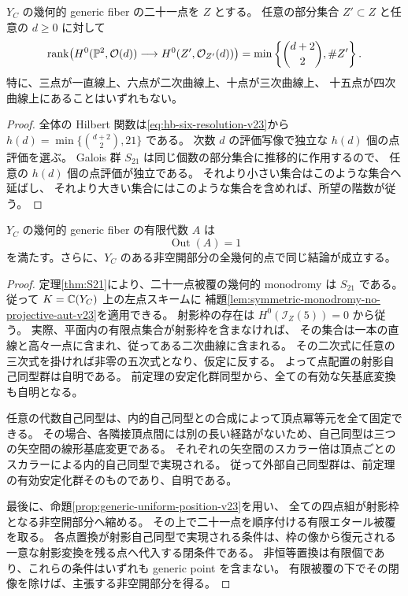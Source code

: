 \begin{proposition}
\label{prop:generic-uniform-position-v23}
$Y_C$ の幾何的 generic fiber の二十一点を $Z$ とする。
任意の部分集合 $Z'\subset Z$ と任意の $d\ge0$ に対して
\[
 \operatorname{rank}\bigl(H^0(\mathbb P^2,\mathcal O(d))
                 \longrightarrow H^0(Z',\mathcal O_{Z'}(d))\bigr)
 =\min\left\{\binom{d+2}{2},\#Z'\right\}.
\]
特に、三点が一直線上、六点が二次曲線上、十点が三次曲線上、
十五点が四次曲線上にあることはいずれもない。
\end{proposition}
\begin{proof}
全体の Hilbert 関数は\eqref{eq:hb-six-resolution-v23}から
$h(d)=\min\{\binom{d+2}{2},21\}$ である。
次数 $d$ の評価写像で独立な $h(d)$ 個の点評価を選ぶ。
Galois 群 $S_{21}$ は同じ個数の部分集合に推移的に作用するので、
任意の $h(d)$ 個の点評価が独立である。
それより小さい集合はこのような集合へ延ばし、
それより大きい集合にはこのような集合を含めれば、所望の階数が従う。
\end{proof}

\begin{theorem}[一般の外部自己同型群の自明性]
\label{thm:generic-outer-automorphism-trivial-v23}
$Y_C$ の幾何的 generic fiber の有限代数 $A$ は
\[
 \operatorname{Out}(A)=1
\]
を満たす。さらに、$Y_C$ のある非空開部分の全幾何的点で同じ結論が成立する。
\end{theorem}
\begin{proof}
定理\ref{thm:S21}により、二十一点被覆の幾何的 monodromy は $S_{21}$ である。
従って $K=\mathbb C(Y_C)$ 上の左点スキームに
補題\ref{lem:symmetric-monodromy-no-projective-aut-v23}を適用できる。
射影枠の存在は $H^0(\mathcal I_Z(5))=0$ から従う。
実際、平面内の有限点集合が射影枠を含まなければ、
その集合は一本の直線と高々一点に含まれ、従ってある二次曲線に含まれる。
その二次式に任意の三次式を掛ければ非零の五次式となり、仮定に反する。
よって点配置の射影自己同型群は自明である。
前定理の安定化群同型から、全ての有効な矢基底変換も自明となる。

任意の代数自己同型は、内的自己同型との合成によって頂点冪等元を全て固定できる。
その場合、各隣接頂点間には別の長い経路がないため、自己同型は三つの矢空間の線形基底変更である。
それぞれの矢空間のスカラー倍は頂点ごとのスカラーによる内的自己同型で実現される。
従って外部自己同型群は、前定理の有効安定化群そのものであり、自明である。

最後に、命題\ref{prop:generic-uniform-position-v23}を用い、
全ての四点組が射影枠となる非空開部分へ縮める。
その上で二十一点を順序付ける有限エタール被覆を取る。
各点置換が射影自己同型で実現される条件は、枠の像から復元される
一意な射影変換を残る点へ代入する閉条件である。
非恒等置換は有限個であり、これらの条件はいずれも generic point を含まない。
有限被覆の下でその閉像を除けば、主張する非空開部分を得る。
\end{proof}

